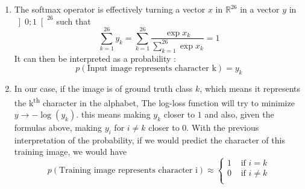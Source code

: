 \documentclass{article}
\begin{document}
\begin{enumerate}
\item The softmax operator is effectively turning a vector $x$ in
  $\mathbb{R}^{26}$ in a vector $y$ in $\left]0;1\right[^{26}$
  such that
  \begin{equation*}
    \sum_{k = 1}^{26} y_k = \sum_{k = 1}^{26} \dfrac{\exp{x_k}}{\sum_{k = 1}^{26} \exp{x_k}} = 1
  \end{equation*}
  It can then be interpreted as a probability :
  \begin{equation*}
    p(\text{Input image represents character k}) = y_k
  \end{equation*}

\item In our case, if the image is of ground truth class $k$, which
  means it represents the k\textsuperscript{th} character in the
  alphabet, The log-loss function will try to minimize
  $y \to - \log{(y_k)}$.  this means making $y_k$ closer to $1$ and
  also, given the formulas above, making $y_i$ for $i \ne k$ closer to
  $0$. With the previous interpretation of the probability,
  if we would predict the character of this training image, we would
  have
  \begin{equation*}
    p(\text{Training image represents character i}) \approx
    \left\{
      \begin{array}{ll}
        1 & \text{ if } i = k \\
        0 & \text{ if } i \ne k \\
      \end{array}
    \right.
  \end{equation*}

\end{enumerate}


\end{document}
